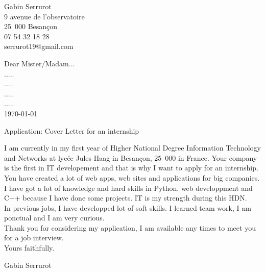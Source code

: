 \documentclass[11pt,a4paper,openany]{book}
\begin{document}
\thispagestyle{empty}

\begin{flushleft}
Gabin Serrurot\\
9 avenue de l'observatoire\\
25~000 Besançon\\
07 54 32 18 28\\
serrurot19@gmail.com\newline
\end{flushleft}

\medskip

\begin{flushright}
Dear Mister/Madam...\\
.....\\
.....\\
.....\\
.....\\
\today\\
\end{flushright}

\medskip

\begin{flushleft}
Application: Cover Letter for an internship \newline
\end{flushleft}

I am currently in my first year of Higher National Degree Information Technology and Networks at lycée Jules Haag in Besançon, 25~000 in France. Your company is the first in IT developement and that is why I want to apply for an internship.\newline
You have created a lot of web apps, web sites and applications for big companies.\\
I have got a lot of knowledge and hard skills in Python, web developpment and C++ because I have done some projects. IT is my strength during this HDN.\\
In previous jobs, I have developped lot of soft skills. I learned team work, I am ponctual and I am very curious.\\

Thank you for considering my application, I am available any times to meet you for a job interview.\\

Yours faithfully.\\

\begin{flushright}
Gabin Serrurot
\end{flushright}
\end{document}
